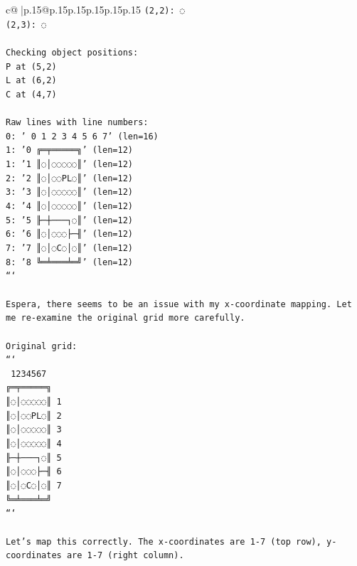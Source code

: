 \documentclass{article}
\begin{document}
{\begin{supertabular}{c@{$\;$}|p{.15\linewidth}@{}p{.15\linewidth}p{.15\linewidth}p{.15\linewidth}p{.15\linewidth}p{.15\linewidth}}
{{{\texttt{(2,2): ◌} \\
\texttt{(2,3): ◌} \\
\\ 
\texttt{Checking object positions:} \\
\texttt{P at (5,2)} \\
\texttt{L at (6,2)} \\
\texttt{C at (4,7)} \\
\\ 
\texttt{Raw lines with line numbers:} \\
\texttt{0: '  0 1 2 3 4 5 6 7' (len=16)} \\
\texttt{1: '0 ╔═╤═════╗' (len=12)} \\
\texttt{1: '1 ║◌│◌◌◌◌◌║' (len=12)} \\
\texttt{2: '2 ║◌│◌◌PL◌║' (len=12)} \\
\texttt{3: '3 ║◌│◌◌◌◌◌║' (len=12)} \\
\texttt{4: '4 ║◌│◌◌◌◌◌║' (len=12)} \\
\texttt{5: '5 ╟─┼───┐◌║' (len=12)} \\
\texttt{6: '6 ║◌│◌◌◌├─╢' (len=12)} \\
\texttt{7: '7 ║◌│◌C◌│◌║' (len=12)} \\
\texttt{8: '8 ╚═╧═══╧═╝' (len=12)} \\
\texttt{```} \\
\\ 
\texttt{Espera, there seems to be an issue with my x{-}coordinate mapping. Let me re{-}examine the original grid more carefully.} \\
\\ 
\texttt{Original grid:} \\
\texttt{```} \\
\texttt{ 1234567} \\
\texttt{╔═╤═════╗} \\
\texttt{║◌│◌◌◌◌◌║ 1} \\
\texttt{║◌│◌◌PL◌║ 2} \\
\texttt{║◌│◌◌◌◌◌║ 3} \\
\texttt{║◌│◌◌◌◌◌║ 4} \\
\texttt{╟─┼───┐◌║ 5} \\
\texttt{║◌│◌◌◌├─╢ 6} \\
\texttt{║◌│◌C◌│◌║ 7} \\
\texttt{╚═╧═══╧═╝} \\
\texttt{```} \\
\\ 
\texttt{Let's map this correctly. The x{-}coordinates are 1{-}7 (top row), y{-}coordinates are 1{-}7 (right column).} \\
}}}
\end{supertabular}}
\end{document}
